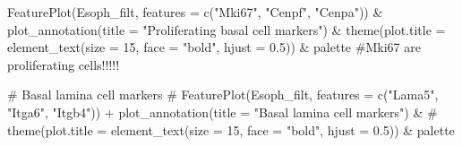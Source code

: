 \documentclass[
  letterpaper,
  DIV=11,
  numbers=noendperiod]{scrreprt}
\newenvironment{Shaded}{\begin{snugshade}}{\end{snugshade}}
\newcommand{\AttributeTok}[1]{\textcolor[rgb]{0.40,0.45,0.13}{#1}}
\newcommand{\CommentTok}[1]{\textcolor[rgb]{0.37,0.37,0.37}{#1}}
\newcommand{\DecValTok}[1]{\textcolor[rgb]{0.68,0.00,0.00}{#1}}
\newcommand{\FloatTok}[1]{\textcolor[rgb]{0.68,0.00,0.00}{#1}}
\newcommand{\FunctionTok}[1]{\textcolor[rgb]{0.28,0.35,0.67}{#1}}
\newcommand{\NormalTok}[1]{\textcolor[rgb]{0.00,0.23,0.31}{#1}}
\newcommand{\SpecialCharTok}[1]{\textcolor[rgb]{0.37,0.37,0.37}{#1}}
\newcommand{\StringTok}[1]{\textcolor[rgb]{0.13,0.47,0.30}{#1}}
\begin{document}
\begin{Shaded}
\begin{Highlighting}[]
\FunctionTok{FeaturePlot}\NormalTok{(Esoph\_filt, }\AttributeTok{features =} \FunctionTok{c}\NormalTok{(}\StringTok{"Mki67"}\NormalTok{, }\StringTok{"Cenpf"}\NormalTok{, }\StringTok{"Cenpa"}\NormalTok{)) }\SpecialCharTok{\&} \FunctionTok{plot\_annotation}\NormalTok{(}\AttributeTok{title =} \StringTok{"Proliferating basal cell markers"}\NormalTok{) }\SpecialCharTok{\&} \FunctionTok{theme}\NormalTok{(}\AttributeTok{plot.title =} \FunctionTok{element\_text}\NormalTok{(}\AttributeTok{size =} \DecValTok{15}\NormalTok{, }\AttributeTok{face =} \StringTok{"bold"}\NormalTok{, }\AttributeTok{hjust =} \FloatTok{0.5}\NormalTok{)) }\SpecialCharTok{\&}\NormalTok{ palette }\CommentTok{\#Mki67 are proliferating cells!!!!!}

\CommentTok{\# Basal lamina cell markers}
\CommentTok{\# FeaturePlot(Esoph\_filt, features = c("Lama5", "Itga6", "Itgb4")) + plot\_annotation(title = "Basal lamina cell markers") \&}
\CommentTok{\#  theme(plot.title = element\_text(size = 15, face = "bold", hjust = 0.5)) \& palette}
\end{Highlighting}
\end{Shaded}
\end{document}

